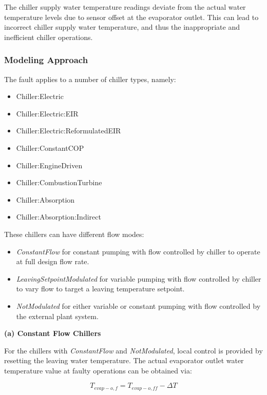 The chiller supply water temperature readings deviate from the actual water temperature levels due to sensor offset at the evaporator outlet. This can lead to incorrect chiller supply water temperature, and thus the inappropriate and inefficient chiller operations.

\subsubsection{Modeling Approach}

The fault applies to a number of chiller types, namely:

\begin{itemize}
\tightlist
\item
  Chiller:Electric
\item
  Chiller:Electric:EIR
\item
  Chiller:Electric:ReformulatedEIR
\item
  Chiller:ConstantCOP
\item
  Chiller:EngineDriven
\item
  Chiller:CombustionTurbine
\item
  Chiller:Absorption
\item
  Chiller:Absorption:Indirect
\end{itemize}

These chillers can have different flow modes:

\begin{itemize}
\tightlist
\item
  \emph{ConstantFlow} for constant pumping with flow controlled by chiller to operate at full design flow rate.
\item
  \emph{LeavingSetpointModulated} for variable pumping with flow controlled by chiller to vary flow to target a leaving temperature setpoint.
\item
  \emph{NotModulated} for either variable or constant pumping with flow controlled by the external plant system.
\end{itemize}

\textbf{(a) Constant Flow Chillers}

For the chillers with \emph{ConstantFlow} and \emph{NotModulated}, local control is provided by resetting the leaving water temperature. The actual evaporator outlet water temperature value at faulty operations can be obtained via:

\begin{equation}
T_{evap-o,f} = T_{evap-o,ff} - \Delta T
\end{equation}

